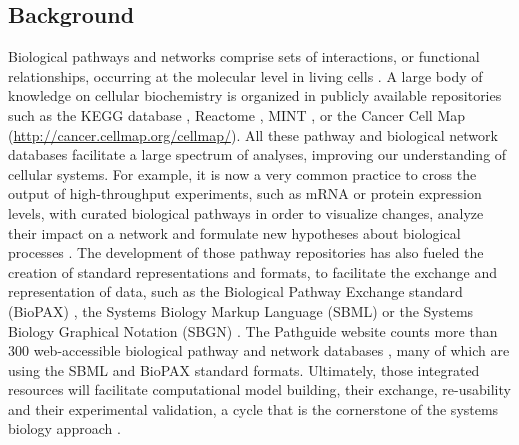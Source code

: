 \documentclass[11pt]{bmc_article_s50}
\newenvironment{bmcformat}{\begin{raggedright}\baselineskip20pt\sloppy\setboolean{publ}{false}}{\end{raggedright}\baselineskip20pt\sloppy}
\begin{document}
\begin{bmcformat}




\section*{Background}

Biological pathways and networks comprise sets of interactions, or functional
relationships, occurring at the molecular level in living cells
\cite{adriaens2008public, cary2005pathway}.
A large body of knowledge on cellular biochemistry is organized in publicly available
repositories such as the KEGG database \cite{ogata1999kegg}, Reactome
\cite{joshi2005reactome}, MINT \cite{zanzoni2002mint}, or the Cancer Cell Map
(\url{http://cancer.cellmap.org/cellmap/}). All these pathway and biological
network databases facilitate a large spectrum of analyses, improving our
understanding of cellular systems. For example, it is now a very common
practice to cross the output of high-throughput experiments, such as mRNA or
protein expression levels, with curated biological pathways in
order to visualize changes, analyze their impact on a network and
formulate new hypotheses about
biological processes \cite{saraiya2005visualizing,
gehlenborg2010visualization}. The development of those pathway repositories has
also fueled the creation of standard representations and formats, to facilitate
the exchange and representation of data, such as the Biological Pathway
Exchange standard (BioPAX) \cite{demir2010biopax}, the Systems Biology Markup
Language (SBML) \cite{hucka2003systems} or the Systems Biology Graphical
Notation (SBGN) \cite{le2009systems}. The Pathguide website counts
more than 300 web-accessible biological pathway and network databases
\cite{bader2006pathguide}, many of which are using the SBML and BioPAX standard
formats. Ultimately, those integrated resources will facilitate computational
model building, their exchange, re-usability and their experimental validation, a cycle that is the
cornerstone of the systems biology approach \cite{karlebach2008modelling,
kitano2002systems, ideker2001new}.


\end{bmcformat}
\end{document}

